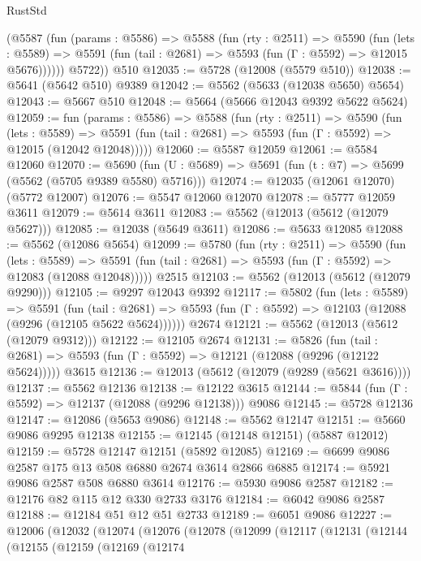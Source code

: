 \begin{lexlean}{RustStd}
\begin{coremodule}
        (@5587
          (fun (params : @5586) =>
          @5588
            (fun (rty : @2511) =>
            @5590
              (fun (lets : @5589) =>
              @5591 (fun (tail : @2681) => @5593 (fun (Γ : @5592) => @12015 @5676))))))
        @5722))
    @510
@12035 := @5728 (@12008 (@5579 @510))
@12038 := @5641 (@5642 @510) @9389
@12042 := @5562 (@5633 (@12038 @5650) @5654)
@12043 := @5667 @510
@12048 := @5664 (@5666 @12043 @9392 @5622 @5624)
@12059 := fun (params : @5586) =>
  @5588
    (fun (rty : @2511) =>
    @5590
      (fun (lets : @5589) =>
      @5591 (fun (tail : @2681) => @5593 (fun (Γ : @5592) => @12015 (@12042 @12048)))))
@12060 := @5587 @12059
@12061 := @5584 @12060
@12070 := @5690 (fun (U : @5689) => @5691 (fun (t : @7) => @5699 (@5562 (@5705 @9389 @5580) @5716)))
@12074 := @12035 (@12061 @12070) (@5772 @12007)
@12076 := @5547 @12060 @12070
@12078 := @5777 @12059 @3611
@12079 := @5614 @3611
@12083 := @5562 (@12013 (@5612 (@12079 @5627)))
@12085 := @12038 (@5649 @3611)
@12086 := @5633 @12085
@12088 := @5562 (@12086 @5654)
@12099 := @5780
    (fun (rty : @2511) =>
    @5590
      (fun (lets : @5589) =>
      @5591 (fun (tail : @2681) => @5593 (fun (Γ : @5592) => @12083 (@12088 @12048)))))
    @2515
@12103 := @5562 (@12013 (@5612 (@12079 @9290)))
@12105 := @9297 @12043 @9392
@12117 := @5802
    (fun (lets : @5589) =>
    @5591
      (fun (tail : @2681) =>
      @5593 (fun (Γ : @5592) => @12103 (@12088 (@9296 (@12105 @5622 @5624))))))
    @2674
@12121 := @5562 (@12013 (@5612 (@12079 @9312)))
@12122 := @12105 @2674
@12131 := @5826
    (fun (tail : @2681) => @5593 (fun (Γ : @5592) => @12121 (@12088 (@9296 (@12122 @5624)))))
    @3615
@12136 := @12013 (@5612 (@12079 (@9289 (@5621 @3616))))
@12137 := @5562 @12136
@12138 := @12122 @3615
@12144 := @5844 (fun (Γ : @5592) => @12137 (@12088 (@9296 @12138))) @9086
@12145 := @5728 @12136
@12147 := @12086 (@5653 @9086)
@12148 := @5562 @12147
@12151 := @5660 @9086 @9295 @12138
@12155 := @12145 (@12148 @12151) (@5887 @12012)
@12159 := @5728 @12147 @12151 (@5892 @12085)
@12169 := @6699 @9086 @2587 @175 @13 @508 @6880 @2674 @3614 @2866 @6885
@12174 := @5921 @9086 @2587 @508 @6880 @3614
@12176 := @5930 @9086 @2587
@12182 := @12176 @82 @115 @12 @330 @2733 @3176
@12184 := @6042 @9086 @2587
@12188 := @12184 @51 @12 @51 @2733
@12189 := @6051 @9086
@12227 := @12006
    (@12032
      (@12074
        (@12076
          (@12078
            (@12099
              (@12117
                (@12131
                  (@12144
                    (@12155
                      (@12159
                        (@12169
                          (@12174

\end{coremodule}
\end{lexlean}
